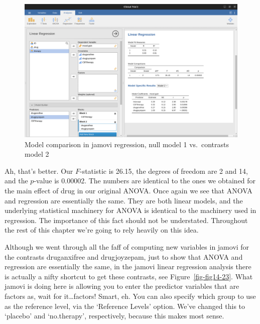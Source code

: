 \documentclass[
  a4paper,
]{book}
\begin{document}
\begin{figure}

\includegraphics[width=1\textwidth,height=\textheight]{images/fig14-22.png} \hfill{}

\caption{\label{fig-fig14-22}Model comparison in jamovi regression, null
model 1 vs.~contrasts model 2}

\end{figure}

Ah, that's better. Our \(F\)-statistic is 26.15, the degrees of freedom
are 2 and 14, and the \(p\)-value is 0.00002. The numbers are identical
to the ones we obtained for the main effect of drug in our original
ANOVA. Once again we see that ANOVA and regression are essentially the
same. They are both linear models, and the underlying statistical
machinery for ANOVA is identical to the machinery used in regression.
The importance of this fact should not be understated. Throughout the
rest of this chapter we're going to rely heavily on this idea.

Although we went through all the faff of computing new variables in
jamovi for the contrasts druganxifree and drugjoyzepam, just to show
that ANOVA and regression are essentially the same, in the jamovi linear
regression analysis there is actually a nifty shortcut to get these
contrasts, see Figure~\ref{fig-fig14-23}. What jamovi is doing here is
allowing you to enter the predictor variables that are factors as, wait
for it\ldots factors! Smart, eh. You can also specify which group to use
as the reference level, via the `Reference Levels' option. We've changed
this to `placebo' and `no.therapy', respectively, because this makes
most sense.
\end{document}

